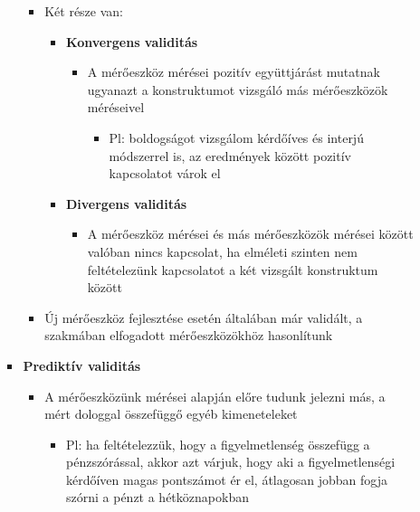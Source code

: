 \documentclass[
  letterpaper,
  DIV=11,
  numbers=noendperiod]{scrreprt}
\providecommand{\tightlist}{%
  \setlength{\itemsep}{0pt}\setlength{\parskip}{0pt}}\usepackage{longtable,booktabs,array}
\begin{document}
\begin{itemize}
\begin{itemize}
\begin{itemize}
      \begin{itemize}
      \item
        Két része van:

        \begin{itemize}
        \item
          \textbf{Konvergens validitás}

          \begin{itemize}
          \item
            A mérőeszköz mérései pozitív együttjárást mutatnak ugyanazt
            a konstruktumot vizsgáló más mérőeszközök méréseivel

            \begin{itemize}
            \tightlist
            \item
              Pl: boldogságot vizsgálom kérdőíves és interjú módszerrel
              is, az eredmények között pozitív kapcsolatot várok el
            \end{itemize}
          \end{itemize}
        \item
          \textbf{Divergens validitás}

          \begin{itemize}
          \tightlist
          \item
            A mérőeszköz mérései és más mérőeszközök mérései között
            valóban nincs kapcsolat, ha elméleti szinten nem
            feltételezünk kapcsolatot a két vizsgált konstruktum között
          \end{itemize}
        \end{itemize}
      \item
        Új mérőeszköz fejlesztése esetén általában már validált, a
        szakmában elfogadott mérőeszközökhöz hasonlítunk
      \end{itemize}
    \item
      \textbf{Prediktív validitás}

      \begin{itemize}
      \item
        A mérőeszközünk mérései alapján előre tudunk jelezni más, a mért
        dologgal összefüggő egyéb kimeneteleket

        \begin{itemize}
        \tightlist
        \item
          Pl: ha feltételezzük, hogy a figyelmetlenség összefügg a
          pénzszórással, akkor azt várjuk, hogy aki a figyelmetlenségi
          kérdőíven magas pontszámot ér el, átlagosan jobban fogja
          szórni a pénzt a hétköznapokban
        \end{itemize}
      \end{itemize}
    \end{itemize}
  \end{itemize}
\end{itemize}
\end{document}
